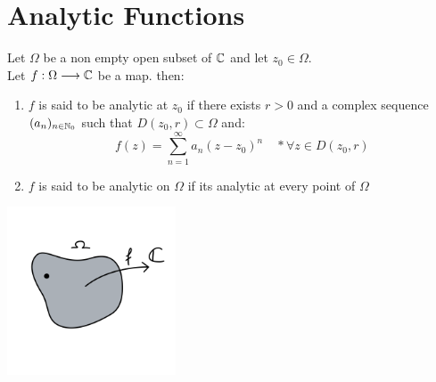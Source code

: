 \section{Analytic Functions}
\begin{definition}[]
Let $\Omega  $ be a non empty open subset of $\mathbb{C}  $ and let $z_0 \in   \Omega  $. \\
Let $ f : \Omega  \longrightarrow \mathbb{C}  $ be a map. then: 
\begin{enumerate}
\item $f $ is said to be analytic at $z_0 $ if there exists $r > 0 $ and a complex sequence 
  $(a_n ) _{n \in   \mathbb{N}_0} $ such that $D(z_0, r) \subset \Omega  $  and: 
  \[
  f(z) = 
  \sum_{n=1}^{\infty} a_n (z-z_0) ^n \quad *\forall  z \in   D(z_0, r) 
  \]
  \item $f $ is said to be analytic on $\Omega  $ if its analytic at every point of 
    $\Omega $ 
\end{enumerate}
\end{definition}
\begin{center}
\includegraphics[width=5cm]{images/analytic.png}
\end{center}
